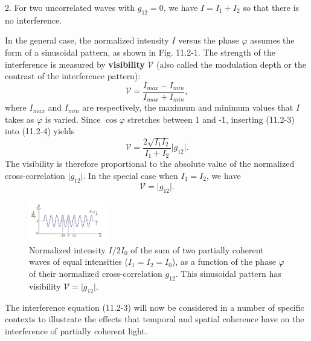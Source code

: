 \documentclass{article}
\numberwithin{figure}{subsection}
\numberwithin{table}{subsection}
\begin{document}
\bigbreak\par 2. For two uncorrelated waves with $ g_{12} = 0 $, we have $ I = I_1 + I_2 $ so that there is no interference.
\bigbreak\par In the general case, the normalized intensity $ I $ versus the phase $ \varphi $ assumes the form of a sinusoidal pattern, as shown in Fig. 11.2-1. The strength of the interference is measured by \textbf{visibility} $ \mathcal{V} $ (also called the modulation depth or the contrast of the interference pattern):
\begin{equation}
\mathcal{V} = \frac{I_{max} - I_{min}}{I_{max} + I_{min}},
\end{equation}
where $ I_{max} $ and $ I_{min} $ are respectively, the maximum and minimum values that $ I $ takes as $ \varphi $ is varied. Since $ \cos \varphi $ stretches between 1 and -1, inserting (11.2-3) into (11.2-4) yields
\begin{equation}
\mathcal{V} = \frac{2\sqrt{I_1 I_2}}{I_1 + I_2} \lvert g_{12} \rvert .
\end{equation}
The visibility is therefore proportional to the absolute value of the normalized cross-correlation $ \lvert g_{12} \rvert $. In the special case when $ I_1 = I_2 $, we have
\begin{equation}
\mathcal{V} = \lvert g_{12} \rvert .
\end{equation}
 \begin{figure}[H]
\centering
\includegraphics[width=0.3\textwidth]{11_2_1.PNG}
\caption{Normalized intensity $ I / 2I_0 $ of the sum of two partially coherent waves of equal intensities ($ I_1 = I_2 = I_0 $), as a function of the phase $ \varphi $ of their normalized cross-correlation $ g_{12} $. This sinusoidal pattern has visibility $ \mathcal{V} = \lvert g_{12} \rvert $.}
\label{fig: 11_2_1}
\end{figure}
\par The interference equation (11.2-3) will now be considered in a number of specific contexts to illustrate the effects that temporal and spatial coherence have on the interference of partially coherent light.
 
\bigbreak\begingroup
\color{ksc}
\end{document}
